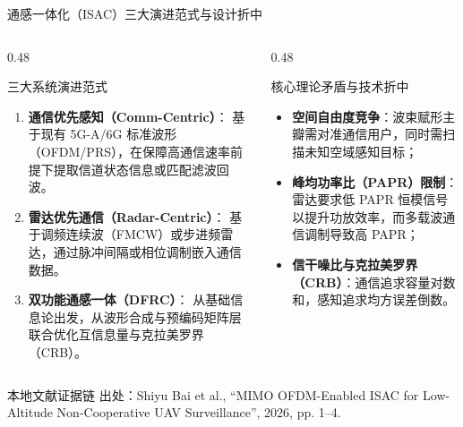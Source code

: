 \documentclass[aspectratio=169, 10pt]{ctexbeamer}
\begin{document}
\begin{frame}{通感一体化（ISAC）三大演进范式与设计折中}
  \begin{columns}
    \begin{column}{0.48\textwidth}
      \begin{block}{三大系统演进范式}
        \begin{enumerate}
          \item \textbf{通信优先感知（Comm-Centric）}：
          基于现有 5G-A/6G 标准波形（OFDM/PRS），在保障高通信速率前提下提取信道状态信息或匹配滤波回波。
          \item \textbf{雷达优先通信（Radar-Centric）}：
          基于调频连续波（FMCW）或步进频雷达，通过脉冲间隔或相位调制嵌入通信数据。
          \item \textbf{双功能通感一体（DFRC）}：
          从基础信息论出发，从波形合成与预编码矩阵层联合优化互信息量与克拉美罗界（CRB）。
        \end{enumerate}
      \end{block}
    \end{column}
    \begin{column}{0.48\textwidth}
      \begin{block}{核心理论矛盾与技术折中}
        \begin{itemize}
          \item \textbf{空间自由度竞争}：波束赋形主瓣需对准通信用户，同时需扫描未知空域感知目标；
          \item \textbf{峰均功率比（PAPR）限制}：雷达要求低 PAPR 恒模信号以提升功放效率，而多载波通信调制导致高 PAPR；
          \item \textbf{信干噪比与克拉美罗界（CRB）}：通信追求容量对数和，感知追求均方误差倒数。
        \end{itemize}
      \end{block}
    \end{column}
  \end{columns}

  \begin{block}{本地文献证据链}
    \footnotesize \textcolor{evidencegray}{出处：Shiyu Bai et al., ``MIMO OFDM-Enabled ISAC for Low-Altitude Non-Cooperative UAV Surveillance'', 2026, pp. 1--4.}
  \end{block}
\end{frame}
\end{document}
